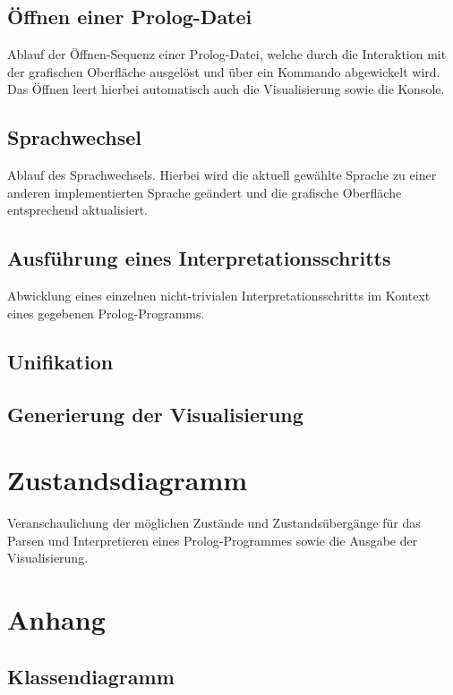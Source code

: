 \documentclass[parskip=full,11pt,twoside]{scrartcl}
\begin{document}
\subsection{Öffnen einer Prolog-Datei}
Ablauf der Öffnen-Sequenz einer Prolog-Datei, welche durch die Interaktion mit der grafischen Oberfläche ausgelöst und über ein Kommando abgewickelt wird. Das Öffnen leert hierbei automatisch auch die Visualisierung sowie die Konsole.

\subsection{Sprachwechsel}
Ablauf des Sprachwechsels. Hierbei wird die aktuell gewählte Sprache zu einer anderen implementierten Sprache geändert und die grafische Oberfläche entsprechend aktualisiert.

\subsection{Ausführung eines Interpretationsschritts}
Abwicklung eines einzelnen nicht-trivialen Interpretationsschritts im Kontext eines gegebenen Prolog-Programms.

\subsection{Unifikation}

\subsection{Generierung der Visualisierung}

\section{Zustandsdiagramm}
Veranschaulichung der möglichen Zustände und Zustandsübergänge für das Parsen und Interpretieren eines Prolog-Programmes sowie die Ausgabe der Visualisierung.

\appendix

\section{Anhang}

\subsection{Klassendiagramm}
\end{document}
